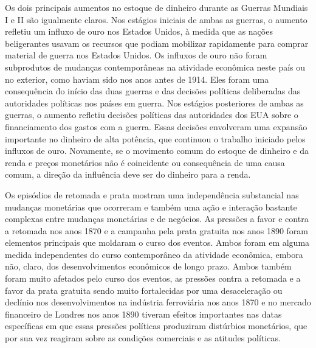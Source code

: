 \documentclass[12pt]{article}
\begin{document}
Os dois principais aumentos no estoque de dinheiro durante as Guerras Mundiais I e II são igualmente claros. Nos estágios iniciais de ambas as guerras, o aumento refletiu um influxo de ouro nos Estados Unidos, à medida que as nações beligerantes usavam os recursos que podiam mobilizar rapidamente para comprar material de guerra nos Estados Unidos. Os influxos de ouro não foram subprodutos de mudanças contemporâneas na atividade econômica neste país ou no exterior, como haviam sido nos anos antes de 1914. Eles foram uma consequência do início das duas guerras e das decisões políticas deliberadas das autoridades políticas nos países em guerra. Nos estágios posteriores de ambas as guerras, o aumento refletiu decisões políticas das autoridades dos EUA sobre o financiamento dos gastos com a guerra. Essas decisões envolveram uma expansão importante no dinheiro de alta potência, que continuou o trabalho iniciado pelos influxos de ouro. Novamente, se o movimento comum do estoque de dinheiro e da renda e preços monetários não é coincidente ou consequência de uma causa comum, a direção da influência deve ser do dinheiro para a renda.

Os episódios de retomada e prata mostram uma independência substancial nas mudanças monetárias que ocorreram e também uma ação e interação bastante complexas entre mudanças monetárias e de negócios. As pressões a favor e contra a retomada nos anos 1870 e a campanha pela prata gratuita nos anos 1890 foram elementos principais que moldaram o curso dos eventos. Ambos foram em alguma medida independentes do curso contemporâneo da atividade econômica, embora não, claro, dos desenvolvimentos econômicos de longo prazo. Ambos também foram muito afetados pelo curso dos eventos, as pressões contra a retomada e a favor da prata gratuita sendo muito fortalecidas por uma desaceleração ou declínio nos desenvolvimentos na indústria ferroviária nos anos 1870 e no mercado financeiro de Londres nos anos 1890 tiveram efeitos importantes nas datas específicas em que essas pressões políticas produziram distúrbios monetários, que por sua vez reagiram sobre as condições comerciais e as atitudes políticas.
\end{document}
